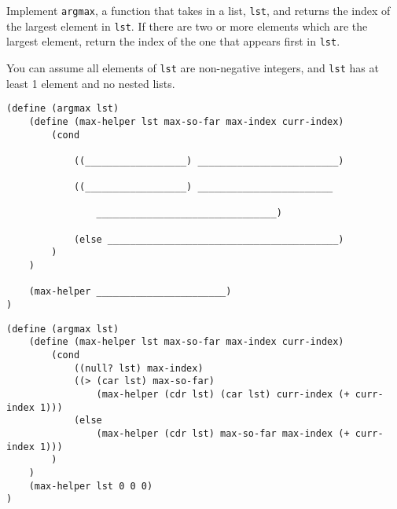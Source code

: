 \question
Implement \lstinline{argmax}, a function that takes in a list, \lstinline{lst}, and returns the index of the largest element in \lstinline{lst}. If there are two or more elements which are the largest element, return the index of the one that appears first in \lstinline{lst}.

You can assume all elements of \lstinline{lst} are non-negative integers, and \lstinline{lst} has at least 1 element and no nested lists.

\begin{lstlisting}
(define (argmax lst)
    (define (max-helper lst max-so-far max-index curr-index)
        (cond

            ((__________________) _________________________)

            ((__________________) ________________________ 

                ________________________________)

            (else _________________________________________)
        )
    )

    (max-helper _______________________)
)
\end{lstlisting}

\begin{solution}
\begin{lstlisting}
(define (argmax lst)
    (define (max-helper lst max-so-far max-index curr-index)
        (cond
            ((null? lst) max-index)
            ((> (car lst) max-so-far) 
                (max-helper (cdr lst) (car lst) curr-index (+ curr-index 1)))
            (else
                (max-helper (cdr lst) max-so-far max-index (+ curr-index 1)))
        )
    )
    (max-helper lst 0 0 0)
)
\end{lstlisting}
\end{solution}